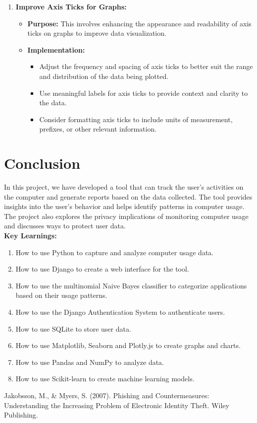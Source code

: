 \documentclass[openany]{report}
\begin{document}
\begin{enumerate}
    \item \textbf{Improve Axis Ticks for Graphs:}
          \begin{itemize}
              \item \textbf{Purpose:} This involves enhancing the appearance and readability of axis ticks on graphs to improve data visualization.
              \item \textbf{Implementation:}
                    \begin{itemize}
                        \item Adjust the frequency and spacing of axis ticks to better suit the range and distribution of the data being plotted.
                        \item Use meaningful labels for axis ticks to provide context and clarity to the data.
                        \item Consider formatting axis ticks to include units of measurement, prefixes, or other relevant information.
                    \end{itemize}
          \end{itemize}
\end{enumerate}


\chapter{Conclusion}
In this project, we have developed a tool that can track the user's activities on the computer and generate reports based on the data collected. The tool provides insights into the user's behavior and helps identify patterns in computer usage. The project also explores the privacy implications of monitoring computer usage and discusses ways to protect user data.\\

\textbf{Key Learnings:}
\begin{enumerate}
    \item How to use Python to capture and analyze computer usage data.
    \item How to use Django to create a web interface for the tool.
    \item How to use the multinomial Naive Bayes classifier to categorize applications based on their usage patterns.
    \item How to use the Django Authentication System to authenticate users.
    \item How to use SQLite to store user data.
    \item How to use Matplotlib, Seaborn and Plotly.js to create graphs and charts.
    \item How to use Pandas and NumPy to analyze data.
    \item How to use Scikit-learn to create machine learning models.
\end{enumerate}

\clearpage
\begin{thebibliography}{10}
    Jakobsson, M., \& Myers, S. (2007). Phishing and Countermeasures: Understanding the Increasing Problem of Electronic Identity Theft. Wiley Publishing.

\end{thebibliography}
\end{document}
